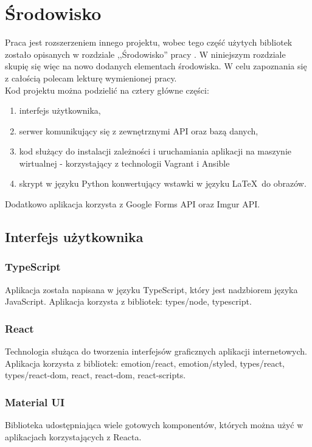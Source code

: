 \chapter{Środowisko}
Praca jest rozszerzeniem innego projektu, wobec tego część użytych bibliotek zostało opisanych 
w rozdziale ,,Środowisko'' pracy \ap. W niniejszym rozdziale skupię się więc na nowo dodanych
elementach środowiska. W celu zapoznania się z całością polecam lekturę wymienionej 
pracy.
\\ Kod projektu można podzielić na cztery główne części:
\begin{enumerate}
  \item interfejs użytkownika,
  \item serwer komunikujący się z zewnętrznymi API oraz bazą danych,
  \item kod służący do instalacji zależności i uruchamiania aplikacji na maszynie wirtualnej 
  - korzystający z technologii Vagrant i Ansible
  \item skrypt w języku Python konwertujący wstawki w języku \LaTeX\ do obrazów.
\end{enumerate}
Dodatkowo aplikacja korzysta z Google Forms API oraz Imgur API.

\section{Interfejs użytkownika}

\subsection{TypeScript}
Aplikacja została napisana w języku TypeScript, który jest nadzbiorem języka JavaScript. 
Aplikacja korzysta z bibliotek: 
types/node, typescript.

\subsection{React}
Technologia służąca do tworzenia interfejsów
graficznych aplikacji internetowych. Aplikacja korzysta z bibliotek:
emotion/react, emotion/styled, types/react, types/react-dom, 
react, react-dom, react-scripts.

\subsection{Material UI}
Biblioteka udostępniająca wiele gotowych komponentów, których można użyć w~
aplikacjach korzystających z Reacta. 

